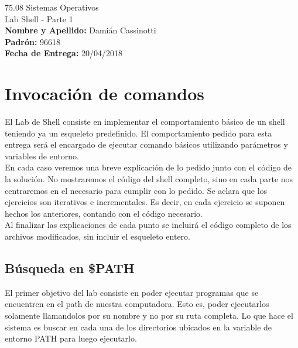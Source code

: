 \documentclass[a4paper, 12pt]{article}
\begin{document}
		
	\begin{titlepage}
		\vspace*{\fill}
		\begin{center}
			\Large 75.08 Sistemas Operativos \\
			\Huge Lab Shell - Parte 1 \\
			\bigskip\bigskip\bigskip
			\large\textbf{Nombre y Apellido:} Damián Cassinotti \\
			\textbf{Padrón:} 96618 \\
			\textbf{Fecha de Entrega:} 20/04/2018\\
					
		\end{center}
		\vspace*{\fill}
	\end{titlepage}
	\newpage
			
	\tableofcontents
	\newpage
	
	\section{Invocación de comandos}
		El Lab de Shell consiste en implementar el comportamiento básico de un shell teniendo ya un esqueleto predefinido. El comportamiento pedido para esta entrega será el encargado de ejecutar comando básicos utilizando parámetros y variables de entorno.\\
		
		En cada caso veremos una breve explicación de lo pedido junto con el código de la solución. No mostraremos el código del shell completo, sino en cada parte nos centraremos en el necesario para cumplir con lo pedido. Se aclara que los ejercicios son iterativos e incrementales. Es decir, en cada ejercicio se suponen hechos los anteriores, contando con el código necesario.\\
		
		Al finalizar las explicaciones de cada punto se incluirá el código completo de los archivos modificados, sin incluir el esqueleto entero.
		\subsection{Búsqueda en \$PATH}
		El primer objetivo del lab consiste en poder ejecutar programas que se encuentren en el path de nuestra computadora. Esto es, poder ejecutarlos solamente llamandolos por su nombre y no por su ruta completa. Lo que hace el sistema es buscar en cada una de los directorios ubicados en la variable de entorno PATH para luego ejecutarlo.\\
		
\end{document}
